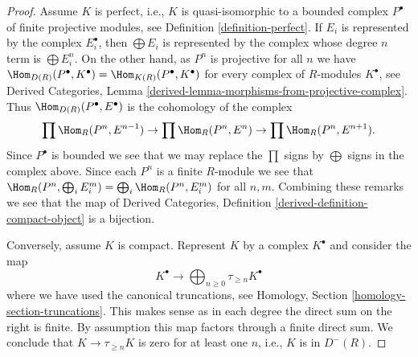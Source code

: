 \begin{proof}
Assume $K$ is perfect, i.e., $K$ is quasi-isomorphic to a bounded complex
$P^\bullet$ of finite projective modules, see
Definition \ref{definition-perfect}. If $E_i$ is represented by the complex
$E_i^\bullet$, then $\bigoplus E_i$ is represented by the complex
whose degree $n$ term is $\bigoplus E_i^n$. On the other hand,
as $P^n$ is projective for all $n$ we have
$\Hom_{D(R)}(P^\bullet, K^\bullet) = \Hom_{K(R)}(P^\bullet, K^\bullet)$
for every complex of $R$-modules $K^\bullet$, see
Derived Categories,
Lemma \ref{derived-lemma-morphisms-from-projective-complex}.
Thus $\Hom_{D(R)}(P^\bullet, E^\bullet)$ is the cohomology of the complex
$$
\prod \Hom_R(P^n, E^{n - 1}) \to
\prod \Hom_R(P^n, E^n) \to
\prod \Hom_R(P^n, E^{n + 1}).
$$
Since $P^\bullet$ is bounded we see that we may replace the $\prod$
signs by $\bigoplus$ signs in the complex above. Since each $P^n$ is a finite
$R$-module we see that
$\Hom_R(P^n, \bigoplus_i E_i^m) = \bigoplus_i \Hom_R(P^n, E_i^m)$
for all $n, m$.
Combining these remarks we see that the map of
Derived Categories, Definition \ref{derived-definition-compact-object}
is a bijection.

\medskip\noindent
Conversely, assume $K$ is compact.
Represent $K$ by a complex $K^\bullet$ and consider the map
$$
K^\bullet
\longrightarrow
\bigoplus\nolimits_{n \geq 0} \tau_{\geq n} K^\bullet
$$
where we have used the canonical truncations, see
Homology, Section \ref{homology-section-truncations}.
This makes sense as in each degree the direct sum on the right is finite.
By assumption this map factors through a finite direct sum.
We conclude that $K \to \tau_{\geq n} K$ is zero for at least one $n$,
i.e., $K$ is in $D^{-}(R)$.


\end{proof}
